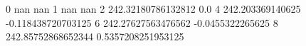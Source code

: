 0 nan nan
1 nan nan
2 242.32180786132812 0.0
4 242.203369140625 -0.118438720703125
6 242.27627563476562 -0.0455322265625
8 242.85752868652344 0.5357208251953125
